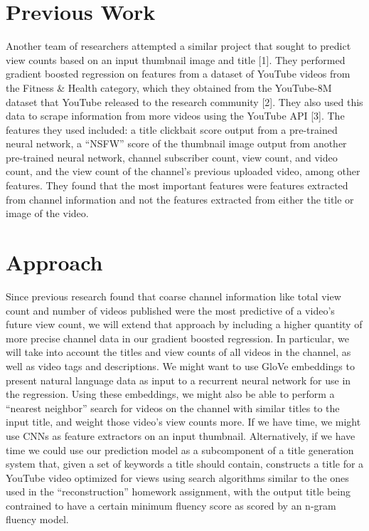 \documentclass[12pt]{article}
\theoremstyle{definition}
\theoremstyle{remark}
\begin{document}
\section{Previous Work}
Another team of researchers attempted a similar project that sought to
predict view counts based on an input thumbnail image and title [1]. They
performed gradient boosted regression on features from 
a dataset of YouTube videos from the Fitness \& Health category,
which they obtained from the YouTube-8M dataset that YouTube released to the
research community [2]. They also used this data to scrape information from more
videos using the YouTube API [3]. The features they used included:
a title clickbait score output from a pre-trained neural network, a ``NSFW''
score of the thumbnail image output from another pre-trained neural network,
channel subscriber count, view count, and video count, and the view count of the
channel's previous uploaded video, among other features. They found that the
most important features were features extracted from channel information and not
the features extracted from either the title or image of the video.

\section{Approach}
Since previous research found that coarse channel information like total view
count and number of videos published were the most predictive of a video's
future view count, we will extend that approach by including
a higher quantity of more precise channel data in our gradient boosted
regression. In particular, we will take into
account the titles and view counts of all videos in the channel, as well as
video tags and descriptions. We might want to use GloVe embeddings to present
natural language data as input to a recurrent neural network for use in the regression.
Using these embeddings, we might also be able to perform a ``nearest neighbor''
search for videos on the channel with similar titles to the input title, and
weight those video's view counts more. If we have time, we might use CNNs as
feature extractors on an input thumbnail. Alternatively, if we have time we
could use our prediction model as a subcomponent of a title generation system
that, given a set of keywords a title should contain, constructs a title for a
YouTube video optimized for views using search algorithms similar to the ones used in
the ``reconstruction'' homework assignment, with the output title being contrained to have a certain minimum fluency score as scored by an n-gram fluency model.
\end{document}
